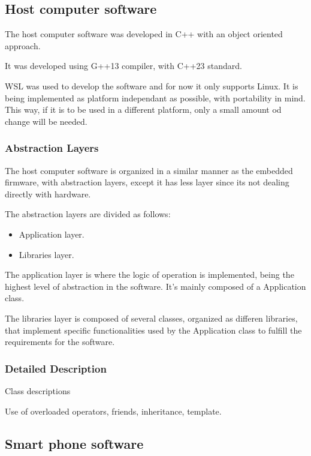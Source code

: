 \documentclass[10pt,twocolumn,letterpaper]{article}
\begin{document}
\subsection{Host computer software}

The host computer software was developed in C++ with an object oriented approach.

It was developed using G++13 compiler, with C++23 standard.

WSL was used to develop the software and for now it only supports Linux.
It is being implemented as platform independant as possible, with portability in mind.
This way, if it is to be used in a different platform, only a small amount od change will be needed.

\subsubsection{Abstraction Layers}

The host computer software is organized in a similar manner as the embedded firmware, with abstraction layers, except it has less layer since its not dealing directly with hardware.

The abstraction layers are divided as follows:
\begin{itemize}
  \item Application layer.
  \item Libraries layer.
\end{itemize}

The application layer is where the logic of operation is implemented, being the highest level of abstraction in the software. It's mainly composed of a Application class.

The libraries layer is composed of several classes, organized as differen libraries, that implement specific functionalities used by the Application class to fulfill the requirements for the software.

\iffalse

\subsubsection{Detailed Description}

Class descriptions

Use of overloaded operators, friends, inheritance, template.

\subsection{Smart phone software}
\end{document}
